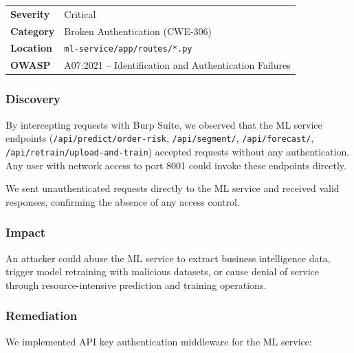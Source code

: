 \documentclass[12pt,a4paper]{article}
\begin{document}
\begin{table}[H]
\centering
\begin{tabularx}{\textwidth}{lX}
\toprule
\textbf{Severity} & \textcolor{critical}{Critical} \\
\textbf{Category} & Broken Authentication (CWE-306) \\
\textbf{Location} & \texttt{ml-service/app/routes/*.py} \\
\textbf{OWASP} & A07:2021 -- Identification and Authentication Failures \\
\bottomrule
\end{tabularx}
\end{table}

\subsubsection{Discovery}

By intercepting requests with Burp Suite, we observed that the ML service endpoints (\texttt{/api/predict/order-risk}, \texttt{/api/segment/}, \texttt{/api/forecast/}, \texttt{/api/retrain/upload-and-train}) accepted requests without any authentication. Any user with network access to port 8001 could invoke these endpoints directly.

We sent unauthenticated requests directly to the ML service and received valid responses, confirming the absence of any access control.

\subsubsection{Impact}

An attacker could abuse the ML service to extract business intelligence data, trigger model retraining with malicious datasets, or cause denial of service through resource-intensive prediction and training operations.

\subsubsection{Remediation}

We implemented API key authentication middleware for the ML service:
\end{document}
